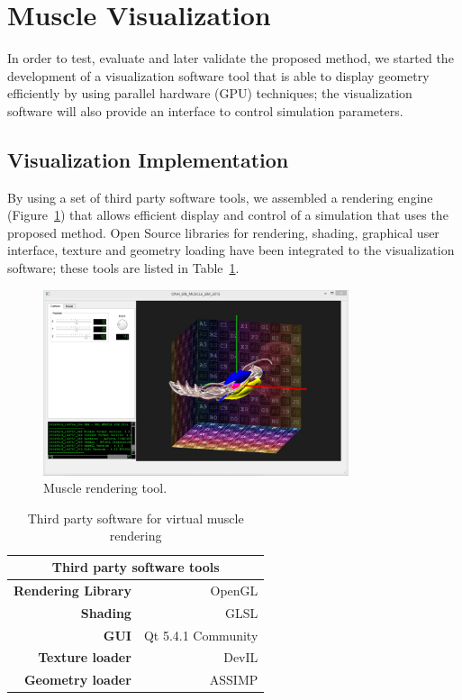 \section{Muscle Visualization}
\label{sec:muscleVis}
In order to test, evaluate and later validate the proposed method, we started the development of a visualization software tool that is able to display geometry efficiently by using parallel hardware (GPU) techniques; the visualization software will also provide an interface to control simulation parameters.


\subsection{Visualization Implementation}

By using a set of third party software tools, we assembled a rendering engine (Figure~\ref{fig:muscleVis}) that allows efficient display and control of a simulation that uses the proposed method. Open Source libraries for rendering, shading, graphical user interface, texture and geometry loading have been integrated to the visualization software; these tools are listed in Table~\ref{tab:thirdSw}.

\begin{figure}[!h]
	\centering
		\includegraphics[width=0.8\textwidth]{./Figures/viewConfig.jpg}
	\caption[Muscle rendering.]{Muscle rendering tool.}
	\label{fig:muscleVis}
\end{figure}

\begin{table}[htbp]
  \centering
  \caption{Third party software for virtual muscle rendering}
    \begin{tabular}{rr}
    \toprule
    \multicolumn{2}{c}{\textbf{Third party software tools}} \\
    \midrule
    \textbf{Rendering Library} & OpenGL \\
    \textbf{Shading} & GLSL \\
    \textbf{GUI} & Qt 5.4.1 Community \\
    \textbf{Texture loader} & DevIL \\
    \textbf{Geometry loader} & ASSIMP \\
    \bottomrule
    \end{tabular}%
  \label{tab:thirdSw}%
\end{table}%

